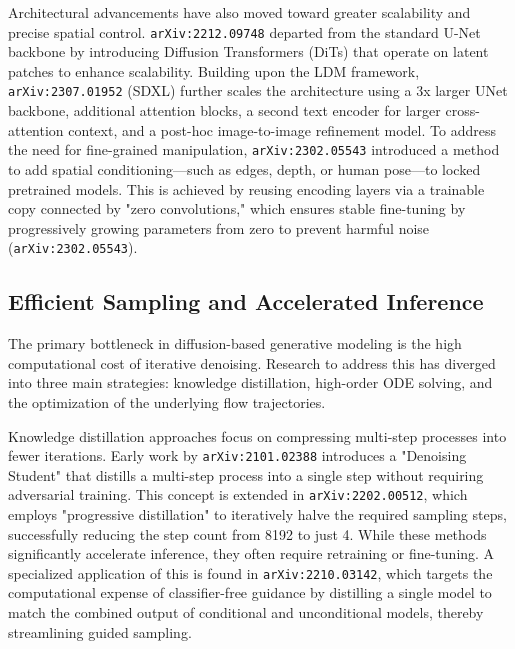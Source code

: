 \documentclass[11pt]{article}
\begin{document}
Architectural advancements have also moved toward greater scalability and precise spatial control. \texttt{arXiv:2212.09748} departed from the standard U-Net backbone by introducing Diffusion Transformers (DiTs) that operate on latent patches to enhance scalability. Building upon the LDM framework, \texttt{arXiv:2307.01952} (SDXL) further scales the architecture using a 3x larger UNet backbone, additional attention blocks, a second text encoder for larger cross-attention context, and a post-hoc image-to-image refinement model. To address the need for fine-grained manipulation, \texttt{arXiv:2302.05543} introduced a method to add spatial conditioning—such as edges, depth, or human pose—to locked pretrained models. This is achieved by reusing encoding layers via a trainable copy connected by "zero convolutions," which ensures stable fine-tuning by progressively growing parameters from zero to prevent harmful noise (\texttt{arXiv:2302.05543}).

\subsection{Efficient Sampling and Accelerated Inference}

The primary bottleneck in diffusion-based generative modeling is the high computational cost of iterative denoising. Research to address this has diverged into three main strategies: knowledge distillation, high-order ODE solving, and the optimization of the underlying flow trajectories.

Knowledge distillation approaches focus on compressing multi-step processes into fewer iterations. Early work by \texttt{arXiv:2101.02388} introduces a "Denoising Student" that distills a multi-step process into a single step without requiring adversarial training. This concept is extended in \texttt{arXiv:2202.00512}, which employs "progressive distillation" to iteratively halve the required sampling steps, successfully reducing the step count from 8192 to just 4. While these methods significantly accelerate inference, they often require retraining or fine-tuning. A specialized application of this is found in \texttt{arXiv:2210.03142}, which targets the computational expense of classifier-free guidance by distilling a single model to match the combined output of conditional and unconditional models, thereby streamlining guided sampling.
\end{document}

